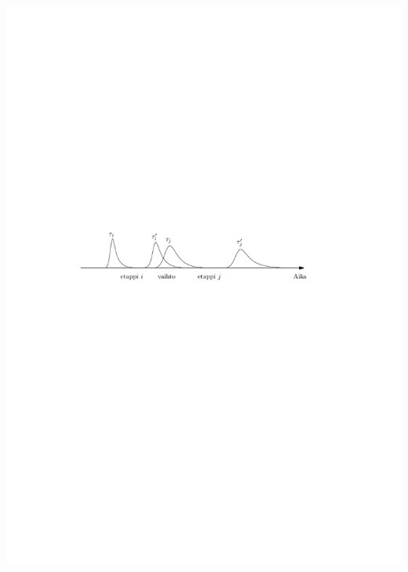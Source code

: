 \documentclass{beamer}
\begin{document}
\begin{frame}
\begin{itemize}
\end{itemize}
     \begin{center}
     \includegraphics[scale=0.6]{transferprob02}
      \end{center}
    \end{frame} 
\end{document}

